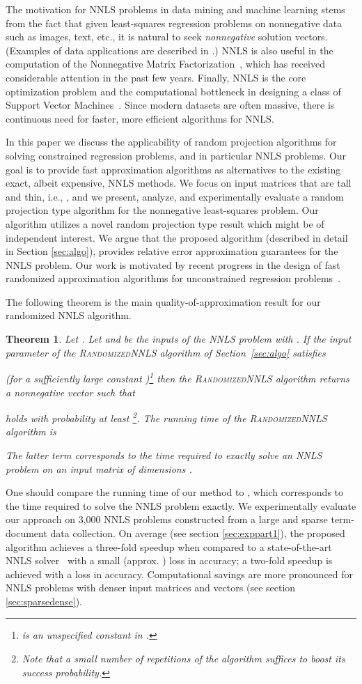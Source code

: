 \documentclass[11pt]{article}
\newtheorem{theorem}{Theorem}
\begin{document}
The motivation for NNLS problems in data mining and machine
learning stems from the fact that given least-squares regression
problems on nonnegative data such as images, text, etc., it is
natural to seek \emph{nonnegative} solution vectors. (Examples of
data applications are described in \cite{CP07}.) NNLS is also
useful in the computation of the Nonnegative Matrix
Factorization~\cite{KP07a}, which has received considerable
attention in the past few years. Finally, NNLS is the core
optimization problem and the computational bottleneck in designing
a class of Support Vector Machines~\cite{SSL02}. Since modern
datasets are often massive, there is continuous need for faster,
more efficient algorithms for NNLS.

In this paper we discuss the applicability of random projection
algorithms for solving constrained regression problems, and in
particular NNLS problems. Our goal is to provide fast
approximation algorithms as alternatives to the existing exact,
albeit expensive, NNLS methods. We focus on input matrices 
that are tall and thin, i.e., , and we present, analyze,
and experimentally evaluate a random projection type algorithm for
the nonnegative least-squares problem. Our algorithm utilizes a
novel random projection type result which might be of independent
interest. We argue that the proposed algorithm (described in
detail in Section \ref{sec:algo}), provides relative error
approximation guarantees for the NNLS problem. Our work is
motivated by recent progress in the design of fast randomized
approximation algorithms for unconstrained  regression
problems~\cite{DMMS07,DDHKM08}.

The following theorem is the main
quality-of-approximation result for our randomized NNLS algorithm.
\begin{theorem}
\label{thm:main_result} Let . Let  and  be the inputs
of the NNLS problem with . If the input parameter  of
the \textsc{RandomizedNNLS} algorithm of Section~\ref{sec:algo}
satisfies

(for a sufficiently large constant )\footnote{ is an
unspecified constant in \cite{RV06}.} then the
\textsc{RandomizedNNLS} algorithm returns a nonnegative vector
 such that

holds with probability at least \footnote{Note that a small
number of repetitions of the algorithm suffices to boost its
success probability.}. The running time of the
\textsc{RandomizedNNLS} algorithm is

The latter term corresponds to the time required to exactly solve
an NNLS problem on an input matrix of dimensions .
\end{theorem}
One should compare the running time of our method to
, which corresponds to the time
required to solve the NNLS problem exactly. We experimentally
evaluate our approach on 3,000 NNLS problems constructed from a
large and sparse term-document data collection. On average (see
section \ref{sec:exppart1}), the proposed algorithm achieves a
three-fold speedup when compared to a state-of-the-art NNLS
solver~\cite{KSD07} with a small (approx. ) loss in
accuracy; a two-fold speedup is achieved with a  loss in
accuracy. Computational savings are more pronounced for NNLS
problems with denser input matrices  and vectors  (see
section \ref{sec:sparsedense}).
\end{document}
